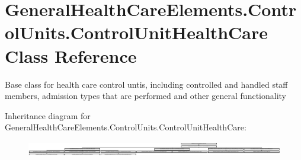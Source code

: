 \hypertarget{class_general_health_care_elements_1_1_control_units_1_1_control_unit_health_care}{}\section{General\+Health\+Care\+Elements.\+Control\+Units.\+Control\+Unit\+Health\+Care Class Reference}
\label{class_general_health_care_elements_1_1_control_units_1_1_control_unit_health_care}


Base class for health care control untis, including controlled and handled staff members, admission types that are performed and other general functionality  


Inheritance diagram for General\+Health\+Care\+Elements.\+Control\+Units.\+Control\+Unit\+Health\+Care\+:\begin{figure}[H]
\begin{center}
\leavevmode
\includegraphics[height=0.671141cm]{class_general_health_care_elements_1_1_control_units_1_1_control_unit_health_care}
\end{center}
\end{figure}
